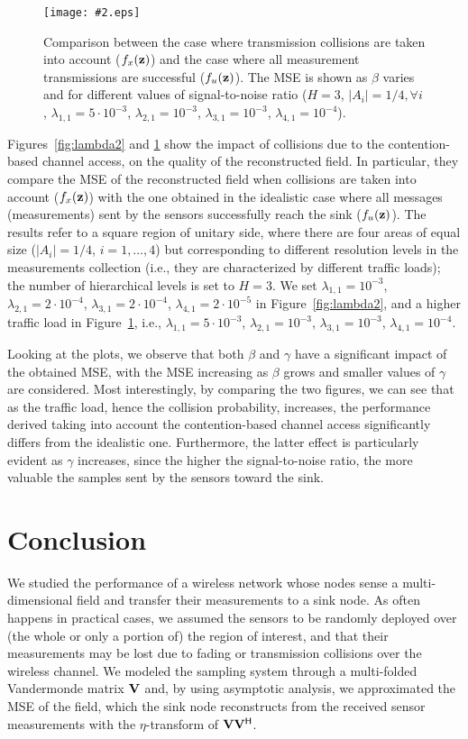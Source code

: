 \documentclass[11pt, draftcls, onecolumn, a4paper]{IEEEtran}
\newcommand{\insertfig}[4]{
\begin{figure}[ht]
\centerline{\texttt{[image: \#2.eps]}}
\caption{#3}\label{#4}\end{figure}}
\newcommand{\zv}{{\bf z}}
\newcommand{\Vm}{{\bf V}}
\def\Herm{\mathsf{^H}}
\begin{document}
\insertfig{0.8}{lambda1}{Comparison between the case where transmission
collisions are taken into account ($f_x(\zv)$) and the case where all measurement transmissions are successful ($f_u(\zv)$). The MSE is shown as $\beta$ varies and for different values of signal-to-noise ratio ($H=3$, $|A_i|=1/4, \forall i$, 
$\lambda_{1,1} =5\cdot 10^{-3}$, $\lambda_{2,1}=10^{-3}$, $\lambda_{3,1} =10^{-3}$, $\lambda_{4,1}=10^{-4}$).}{fig:lambda1}

Figures~\ref{fig:lambda2} and \ref{fig:lambda1} show the impact of 
collisions due to the contention-based channel access, on the
quality of the reconstructed field. In particular, they compare the MSE of the
reconstructed field when collisions are taken into account ($f_x(\zv)$) with
the one obtained in the idealistic case where all messages (measurements) 
sent by the sensors successfully reach the sink ($f_u(\zv)$).
The results refer to a square region of unitary side, where there are four
areas of equal size ($|A_i|=1/4$, $i=1,\ldots,4$) but corresponding 
to different resolution levels in the measurements collection (i.e.,
they are characterized by different traffic loads);
the number of hierarchical levels is set to $H=3$.
We set $\lambda_{1,1} =10^{-3}$, $\lambda_{2,1}=2\cdot 10^{-4}$, $\lambda_{3,1} =2\cdot 10^{-4}$, $\lambda_{4,1}=2\cdot 10^{-5}$ in Figure~\ref{fig:lambda2}, and
a higher traffic load in Figure~\ref{fig:lambda1}, i.e., $\lambda_{1,1} =5\cdot 10^{-3}$, $\lambda_{2,1}=10^{-3}$, $\lambda_{3,1} =10^{-3}$, $\lambda_{4,1}=10^{-4}$. 

Looking at the plots, we observe that both $\beta$ and $\gamma$ have a significant impact of the obtained MSE, with the MSE increasing as $\beta$ grows and smaller values of $\gamma$ are considered. 
Most interestingly, by comparing the two figures,
we can see that as the traffic load, hence the collision probability, increases, the performance derived taking into account the contention-based channel access significantly differs from
the idealistic one. Furthermore, the latter effect is particularly evident as
$\gamma$ increases, since the higher the signal-to-noise ratio, the more
valuable the samples sent by the sensors toward the sink.


\section{Conclusion\label{sec:conclusions}}
We studied the performance of a wireless network whose nodes
sense a multi-dimensional field and transfer their measurements to
a sink node. As often happens in practical cases, we assumed the sensors
to be randomly deployed over (the whole or only a portion of) the 
region of interest, and that their measurements may be lost due to
fading or transmission collisions over the wireless channel.
We modeled the sampling system through
a multi-folded Vandermonde matrix $\Vm$ and, by using asymptotic analysis, 
we approximated the MSE of the field, which the sink node reconstructs
from the received sensor measurements with the $\eta$-transform of 
$\Vm\Vm\Herm$. 
\end{document}
